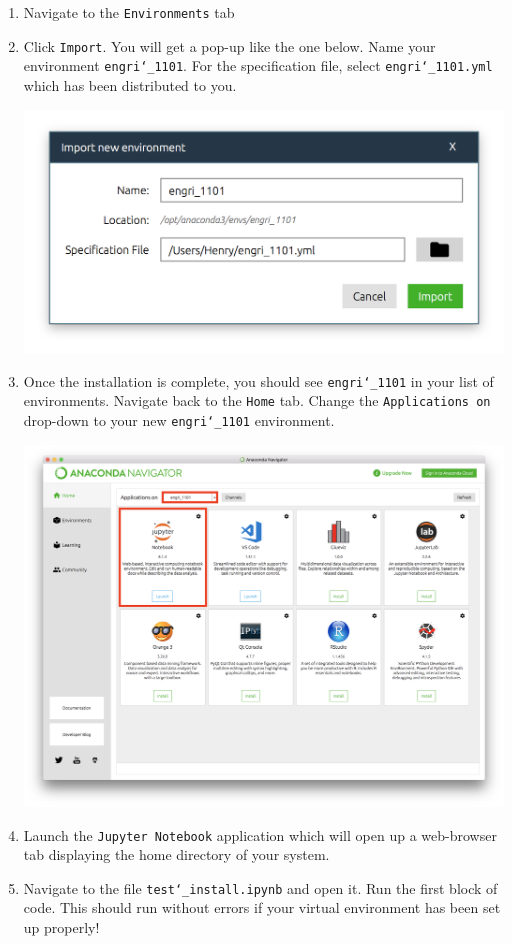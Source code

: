 \documentclass[11 pt]{article}
\begin{document}
\begin{enumerate}

\item Navigate to the \texttt{Environments} tab
\item Click \texttt{Import}. You will get a pop-up like the one below. Name your environment \texttt{engri\char`_1101}. For the specification file, select \texttt{engri\char`_1101.yml} which has been distributed to you. 

\begin{center}
\includegraphics[scale=0.4]{import_env}
\end{center}

\item Once the installation is complete, you should see \texttt{engri\char`_1101} in your list of environments. Navigate back to the \texttt{Home} tab. Change the \texttt{Applications on} drop-down to your new \texttt{engri\char`_1101} environment.

\begin{center}
\includegraphics[scale=0.3]{home_tab}
\end{center}

\item Launch the \texttt{Jupyter Notebook} application which will open up a web-browser tab displaying the home directory of your system. 

\item Navigate to the file \texttt{test\char`_install.ipynb} and open it. Run the first block of code. This should run without errors if your virtual environment has been set up properly!

\end{enumerate}
\end{document}
